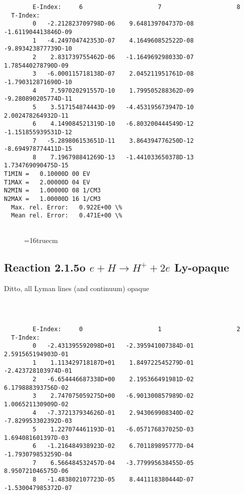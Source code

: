 \documentclass[12pt,dvipdfmx]{article}
\begin{document}
{\begin{small}
\begin{verbatim}
        E-Index:     6                     7                     8
  T-Index:
        0   -2.212823709798D-06    9.648139704737D-08   -1.611904413846D-09
        1   -4.249704742353D-07    4.164960852522D-08   -9.893423877739D-10
        2    2.831739755462D-06   -1.164969298033D-07    1.785440278790D-09
        3   -6.000115718138D-07    2.045211951761D-08   -1.790312871690D-10
        4    7.597020291557D-10    1.799505288362D-09   -9.280890205774D-11
        5    3.517154874443D-09   -4.453195673947D-10    2.002478264932D-11
        6    4.149084521319D-10   -6.803200444549D-12   -1.151855939531D-12
        7   -5.289806153651D-11    3.864394776250D-12   -8.694978774411D-15
        8    7.196798841269D-13   -1.441033650378D-13    1.734769090475D-15
T1MIN =   0.10000D 00 EV
T1MAX =   2.00000D 04 EV
N2MIN =   1.00000D 08 1/CM3
N2MAX =   1.00000D 16 1/CM3
  Max. rel. Error:   0.922E+00 \%
  Mean rel. Error:   0.471E+00 \%


\end{verbatim}\end{small}
\begin{figure} \label{2.1.5iFU}
\epsfxsize=16truecm
\end{figure}
\newpage


\subsection{
Reaction 2.1.5o $ e + H \rightarrow H^+ + 2e $  Ly-opaque}


Ditto, all Lyman lines (and continuum) opaque


\begin{small}\begin{verbatim}



        E-Index:     0                     1                     2
  T-Index:
        0   -2.431395592098D+01   -2.395941007384D-01    2.591565194903D-01
        1    1.113429718187D+01    1.849722545279D-01   -2.423728103974D-01
        2   -6.654446687338D+00    2.195366491981D-02    6.179888393756D-02
        3    2.747075059275D+00   -6.901300857989D-02    1.006521130909D-02
        4   -7.372137934626D-01    2.943069908340D-02   -7.829953302392D-03
        5    1.227074461193D-01   -6.057176837025D-03    1.694081601397D-03
        6   -1.216484938923D-02    6.701189895777D-04   -1.793079853259D-04
        7    6.566484532457D-04   -3.779995638455D-05    8.950721046575D-06
        8   -1.483802107723D-05    8.441118380444D-07   -1.530047985372D-07


\end{verbatim}
\end{small}}
\end{document}
